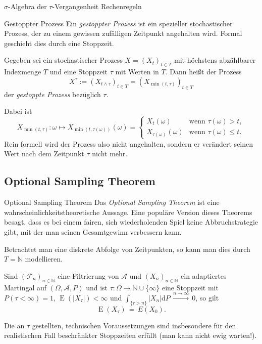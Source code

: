 \begin{info}[Stoppzeit]{$\sigma$-Algebra der $\tau$-Vergangenheit}
    Rechenregeln
\end{info}

\begin{defi}{Gestoppter Prozess}
    Ein \emph{gestoppter Prozess} ist ein spezieller stochastischer Prozess, der zu einem gewissen zufälligen Zeitpunkt angehalten wird.
    Formal geschieht dies durch eine Stoppzeit.

    Gegeben sei ein stochastischer Prozess $X=(X_{t})_{t\in T}$ mit höchstens abzählbarer Indexmenge $T$ und eine Stoppzeit $\tau$ mit Werten in $T$.
    Dann heißt der Prozess
    \[
        X^{\tau} := (X_{t \land \tau })_{t\in T} = (X_{\min(t,\tau )})_{t\in T}
    \]
    der \emph{gestoppte Prozess} bezüglich $\tau$.

    Dabei ist
    \[
        X_{\min(t,\tau)}: \omega \mapsto X_{\min(t,\tau (\omega ))}(\omega ) =
        \begin{cases}
            X_{t}(\omega )              & {\text{wenn }}\tau (\omega )>t,     \\
            X_{\tau (\omega )}(\omega ) & {\text{wenn }}\tau (\omega )\leq t.
        \end{cases}
    \]
    Rein formell wird der Prozess also nicht angehalten, sondern er verändert seinen Wert nach dem Zeitpunkt $\tau$ nicht mehr.
\end{defi}

\subsection{Optional Sampling Theorem}

\begin{theo}{Optional Sampling Theorem}
    Das \emph{Optional Sampling Theorem} ist eine wahrscheinlichkeitstheoretische Aussage.
    Eine populäre Version dieses Theorems besagt, dass es bei einem fairen, sich wiederholenden Spiel keine Abbruchstrategie gibt, mit der man seinen Gesamtgewinn verbessern kann.

    Betrachtet man eine diskrete Abfolge von Zeitpunkten, so kann man dies durch $T=\mathbb{N}$ modellieren.

    Sind $({\mathcal{F}}_{n})_{n\in \mathbb{N} }$ eine Filtrierung von $\mathcal{A}$ und $(X_{n})_{n\in \mathbb{N}}$ ein adaptiertes Martingal auf $(\Omega ,{\mathcal{A}},P)$ und ist $\tau :\Omega \rightarrow \mathbb{N} \cup \{\infty \}$ eine Stoppzeit mit $P(\tau <\infty )=1$, $ \operatorname{E}(|X_{\tau }|)<\infty$ und $\int_{\{\tau >n\}}|X_{n}|{\mathrm{d}}P\,{\stackrel{n\to \infty }{\longrightarrow }}\,0$, so gilt
    \[
        \operatorname{E}(X_{\tau })\,=\,E(X_{0}).
    \]

    Die an $\tau$ gestellten, technischen Voraussetzungen sind insbesondere für den realistischen Fall beschränkter Stoppzeiten erfüllt (man kann nicht ewig warten!).
\end{theo}

